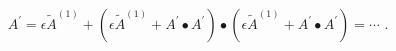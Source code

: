 \begin{equation}
A^{\prime }=\epsilon \tilde{A}^{\left( 1\right) }+(\epsilon \tilde{A}%
^{\left( 1\right) }+A^{\prime }\bullet A^{\prime })\bullet (\epsilon \tilde{A%
}^{\left( 1\right) }+A^{\prime }\bullet A^{\prime })=\cdots \,\,.
\end{equation}


